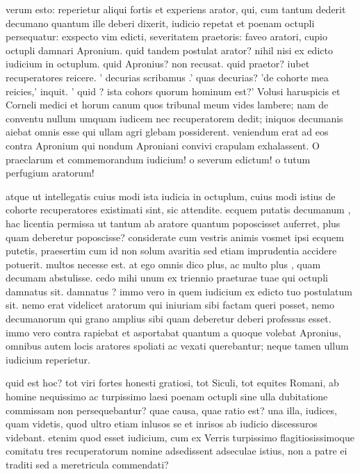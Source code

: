  verum esto: reperietur aliqui fortis et experiens arator, qui, cum tantum dederit decumano quantum ille deberi dixerit, iudicio repetat et poenam octupli persequatur: exspecto vim edicti, severitatem praetoris: faveo aratori, cupio octupli damnari Apronium. quid tandem postulat arator? nihil nisi ex edicto iudicium in octuplum. quid Apronius? non recusat. quid praetor? iubet recuperatores reicere. ' decurias scribamus .' quas decurias? 'de cohorte mea reicies,' inquit. ' quid ? ista cohors quorum hominum est?' Volusi haruspicis et Corneli medici et horum canum quos tribunal meum vides lambere; nam de conventu nullum umquam iudicem nec recuperatorem dedit; iniquos decumanis aiebat omnis esse qui ullam agri glebam possiderent. veniendum erat ad eos contra Apronium qui nondum Aproniani convivi crapulam exhalassent. O praeclarum et commemorandum iudicium! o severum edictum! o tutum perfugium aratorum!

 atque ut intellegatis cuius modi ista iudicia in octuplum, cuius modi istius de cohorte recuperatores existimati sint, sic attendite. ecquem putatis decumanum , hac licentia permissa ut tantum ab aratore quantum poposcisset auferret, plus quam deberetur poposcisse? considerate cum vestris animis vosmet ipsi ecquem putetis, praesertim cum id non solum avaritia sed etiam imprudentia accidere potuerit. multos necesse est. at ego omnis dico plus, ac multo plus , quam decumam abstulisse. cedo mihi unum ex triennio praeturae tuae qui octupli damnatus sit. damnatus ? immo vero in quem iudicium ex edicto tuo postulatum sit. nemo erat videlicet aratorum qui iniuriam sibi factam queri posset, nemo decumanorum qui grano amplius sibi quam deberetur deberi professus esset. immo vero contra rapiebat et asportabat quantum a quoque volebat Apronius, omnibus autem locis aratores spoliati ac vexati querebantur; neque tamen ullum iudicium reperietur.

 quid est hoc? tot viri fortes honesti gratiosi, tot Siculi, tot equites Romani, ab homine nequissimo ac turpissimo laesi poenam octupli sine ulla dubitatione commissam non persequebantur? quae causa, quae ratio est? una illa, iudices, quam videtis, quod ultro etiam inlusos se et inrisos ab iudicio discessuros videbant. etenim quod esset iudicium, cum ex Verris turpissimo flagitiosissimoque comitatu tres recuperatorum nomine adsedissent adseculae istius, non a patre ei traditi sed a meretricula commendati?

